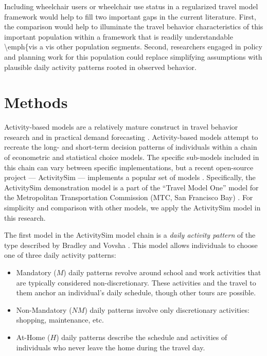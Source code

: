 \documentclass[3p, authoryear, review]{elsarticle} %
\providecommand{\tightlist}{%
  \setlength{\itemsep}{0pt}\setlength{\parskip}{0pt}}
\begin{document}
Including wheelchair users or wheelchair use status in a regularized travel model
framework would help to fill two important gaps in the current literature. First,
the comparison would help to illuminate the travel behavior characteristics of
this important population within a framework that is readily understandable
\textbackslash emph\{vis a vis other population segments. Second, researchers engaged in
policy and planning work for this population could replace simplifying assumptions
with plausible daily activity patterns rooted in observed behavior.

\hypertarget{methodology}{%
\section{Methods}\label{methodology}}

Activity-based models are a relatively mature construct in travel behavior
research and in practical demand forecasting \cite{rasouli2014activity}. Activity-based models attempt
to recreate the long- and short-term decision patterns of individuals within a
chain of econometric and statistical choice models. The specific sub-models included
in this chain can vary between specific implementations, but a recent
open-source project --- ActivitySim \cite{activitysim} --- implements a popular
set of models \cite{davidson2010ct}. Specifically, the ActivitySim demonstration
model is a part of the ``Travel Model One'' model for the Metropolitan
Transportation Commission (MTC, San Francisco Bay) \cite{erhardt2012mtc}.
For simplicity and comparison with other models, we apply the ActivitySim model
in this research.

The first model in the ActivitySim model chain is a \emph{daily activity pattern}
of the type described by Bradley and Vovsha \cite{Bradley2005}. This model
allows individuals to choose one of three daily activity patterns:

\begin{itemize}
\tightlist
\item
  Mandatory (\(M\)) daily patterns revolve around school and work activities that
  are typically considered non-discretionary. These activities and the travel
  to them anchor an individual's daily schedule, though other tours are possible.
\item
  Non-Mandatory (\(NM\)) daily patterns involve only discretionary activities:
  shopping, maintenance, etc.
\item
  At-Home (\(H\)) daily patterns describe the schedule and activities of
  individuals who never leave the home during the travel day.
\end{itemize}
\end{document}
